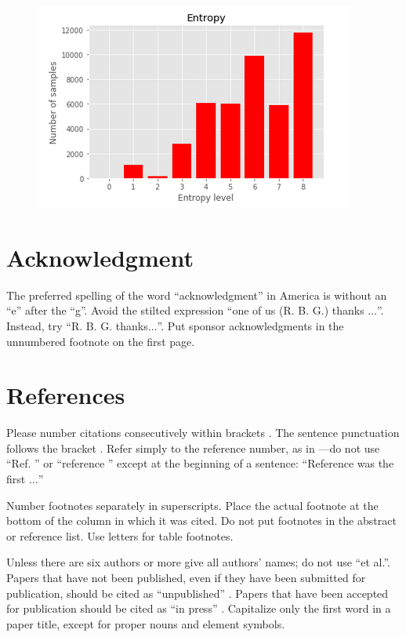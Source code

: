 \documentclass[conference]{IEEEtran}
\begin{document}
\begin{figure}[h]
\centering
\includegraphics{ent.png}
\end{figure}

\section*{Acknowledgment}

The preferred spelling of the word ``acknowledgment'' in America is without 
an ``e'' after the ``g''. Avoid the stilted expression ``one of us (R. B. 
G.) thanks $\ldots$''. Instead, try ``R. B. G. thanks$\ldots$''. Put sponsor 
acknowledgments in the unnumbered footnote on the first page.

\section*{References}

Please number citations consecutively within brackets \cite{b1}. The 
sentence punctuation follows the bracket \cite{b2}. Refer simply to the reference 
number, as in \cite{b3}---do not use ``Ref. \cite{b3}'' or ``reference \cite{b3}'' except at 
the beginning of a sentence: ``Reference \cite{b3} was the first $\ldots$''

Number footnotes separately in superscripts. Place the actual footnote at 
the bottom of the column in which it was cited. Do not put footnotes in the 
abstract or reference list. Use letters for table footnotes.

Unless there are six authors or more give all authors' names; do not use 
``et al.''. Papers that have not been published, even if they have been 
submitted for publication, should be cited as ``unpublished'' \cite{b4}. Papers 
that have been accepted for publication should be cited as ``in press'' \cite{b5}. 
Capitalize only the first word in a paper title, except for proper nouns and 
element symbols.
\end{document}
